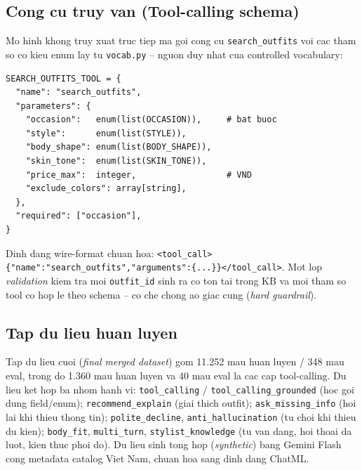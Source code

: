 \documentclass[12pt,a4paper]{article}
\begin{document}
\subsection{Cong cu truy van (Tool-calling schema)}
Mo hinh khong truy xuat truc tiep ma goi cong cu \texttt{search\_outfits} voi cac tham so co
kieu enum lay tu \texttt{vocab.py} -- nguon duy nhat cua controlled vocabulary:
\begin{lstlisting}[caption={Dinh nghia cong cu search\_outfits (trich xuat tu tools.py).}]
SEARCH_OUTFITS_TOOL = {
  "name": "search_outfits",
  "parameters": {
    "occasion":   enum(list(OCCASION)),     # bat buoc
    "style":      enum(list(STYLE)),
    "body_shape": enum(list(BODY_SHAPE)),
    "skin_tone":  enum(list(SKIN_TONE)),
    "price_max":  integer,                  # VND
    "exclude_colors": array[string],
  },
  "required": ["occasion"],
}
\end{lstlisting}
Dinh dang wire-format chuan hoa:
\texttt{<tool\_call>\{"name":"search\_outfits","arguments":\{...\}\}</tool\_call>}. Mot lop
\emph{validation} kiem tra moi \texttt{outfit\_id} sinh ra co ton tai trong KB va moi tham so
tool co hop le theo schema -- co che chong ao giac cung (\emph{hard guardrail}).
\subsection{Tap du lieu huan luyen}
Tap du lieu cuoi (\emph{final merged dataset}) gom 11.252 mau huan luyen / 348 mau eval,
trong do 1.360 mau huan luyen va 40 mau eval la cac cap tool-calling. Du lieu ket hop ba
nhom hanh vi: \texttt{tool\_calling} / \texttt{tool\_calling\_grounded} (hoc goi dung
field/enum); \texttt{recommend\_explain} (giai thich outfit); \texttt{ask\_missing\_info}
(hoi lai khi thieu thong tin); \texttt{polite\_decline}, \texttt{anti\_hallucination} (tu
choi khi thieu du kien); \texttt{body\_fit}, \texttt{multi\_turn}, \texttt{stylist\_knowledge}
(tu van dang, hoi thoai da luot, kien thuc phoi do). Du lieu sinh tong hop (\emph{synthetic})
bang Gemini Flash cong metadata catalog Viet Nam, chuan hoa sang dinh dang ChatML.
\end{document}
